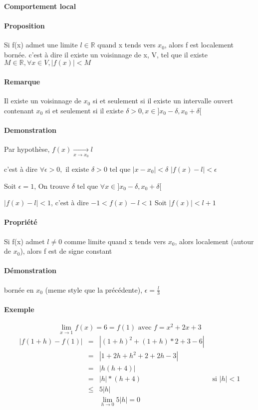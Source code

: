 ~\\
~\\

\paragraph{Comportement local}
\paragraph{Proposition} Si f(x) admet une limite $l \in \mathbb{R}$ quand x tends vers $x_0$, alors f est localement bornée.
c'est à dire il existe un voisinnage de x, V, tel que il existe $M \in \mathbb{R}, \forall x \in V, |f(x)| < M$
\paragraph{Remarque} Il existe un voisinnage de $x_0$ si et seulement si il existe un intervalle ouvert contenant $x_0$ si et seulement si il existe $\delta > 0, x \in ]x_0 - \delta, x_0 + \delta[$

\paragraph{Demonstration}
Par hypothèse, $f(x) \xrightarrow[x \to x_0]{} l$

c'est à dire $\forall \epsilon > 0, \text{ il existe } \delta > 0 \text{ tel que } |x-x_0| < \delta$   $|f(x)-l| < \epsilon$

Soit $\epsilon = 1$, On trouve $\delta$ tel que $\forall x \in ]x_0 - \delta, x_0 + \delta[ $

	$|f(x) - l| < 1$, c'est à dire $-1 < f(x) - l < 1$ Soit $|f(x)| < l+1$ 

\paragraph{Propriété}Si f(x) admet $l \neq 0$ comme limite quand x tends vers $x_0$, alors localement (autour de $x_0$), alors f est de signe constant
\paragraph{Démonstration} bornée en $x_0$ (meme style que la précédente), $\epsilon = \frac{l}{3}$

\paragraph{Exemple} \[\lim_{x \to 1} f(x) = 6 = f(1) \text{ avec } f=x^2+2x+3\]
\[\begin{array}{rcll}
	|f(1+h) - f(1)| &=& |(1+h)^2 + (1+h)*2 + 3 - 6| \\
	&=& |1+2h+h^2 + 2 + 2h -3| \\
	&=& |h(h+4)| \\
	&=& |h|*(h+4)  & \text{      si } |h| < 1 \\
	&\leq& 5|h|\\
	&& \lim_{h \to 0} 5|h| = 0
\end{array}\]

